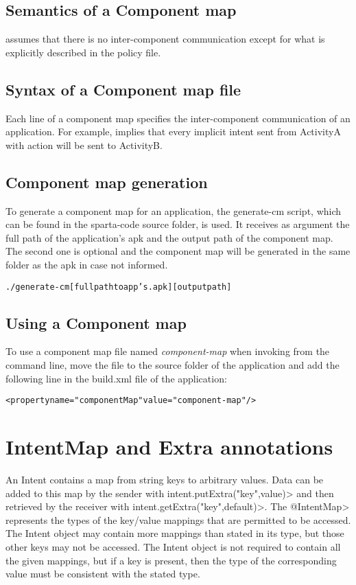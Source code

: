 \subsection{Semantics of a Component map}
\TheFlowChecker{} assumes that there is no inter-component communication
except for what is explicitly described in the policy file. 

\subsection{Syntax of a Component map file}
Each line of a component map specifies the inter-component communication of
an application. For example,  implies that
every implicit intent sent from ActivityA with action  will
be sent to ActivityB. 

\subsection{Component map generation}
To generate a component map for an application, the generate-cm script, which 
can be found in the sparta-code source folder, is used.
It receives as argument the full path of the application's apk and the output
path of the component map. The second one is optional and the component map
will be generated in the same folder as the apk in case not informed.
\begin{alltt}
./generate-cm [full path to app's .apk] [output path]
\end{alltt}

\subsection{Using a Component map}
To use a component map file named \emph{component-map} 
when invoking \TheFlowChecker{} from the command line, move the file to the
source folder of the application and 
add the following line in the build.xml file of the application:
\begin{alltt}
<property name="componentMap" value="component-map"/>
\end{alltt}

\section{IntentMap and Extra annotations}
An Intent contains a map from string keys to arbitrary values. Data can be added
to this map by the sender with \<intent.putExtra("key",value)> and then
retrieved by the receiver with \<intent.getExtra("key",default)>. 
The \<@IntentMap> represents the types
of the key/value mappings that are permitted to be accessed. The Intent object
may contain more mappings than stated in its type, but those other keys may not
be accessed. The Intent object is not required to contain all the given
mappings, but if a key is present, then the type of the corresponding value must
be consistent with the stated type. 

